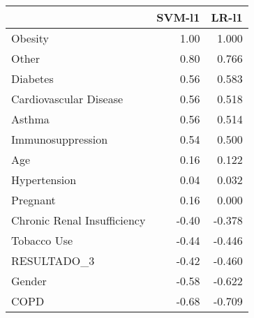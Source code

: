 \begin{tabular}{lrr}
\toprule
{} &  SVM-l1 &  LR-l1 \\
\midrule
Obesity                     &    1.00 &  1.000 \\
Other                       &    0.80 &  0.766 \\
Diabetes                    &    0.56 &  0.583 \\
Cardiovascular Disease      &    0.56 &  0.518 \\
Asthma                      &    0.56 &  0.514 \\
Immunosuppression           &    0.54 &  0.500 \\
Age                         &    0.16 &  0.122 \\
Hypertension                &    0.04 &  0.032 \\
Pregnant                    &    0.16 &  0.000 \\
Chronic Renal Insufficiency &   -0.40 & -0.378 \\
Tobacco Use                 &   -0.44 & -0.446 \\
RESULTADO\_3                 &   -0.42 & -0.460 \\
Gender                      &   -0.58 & -0.622 \\
COPD                        &   -0.68 & -0.709 \\
\bottomrule
\end{tabular}
